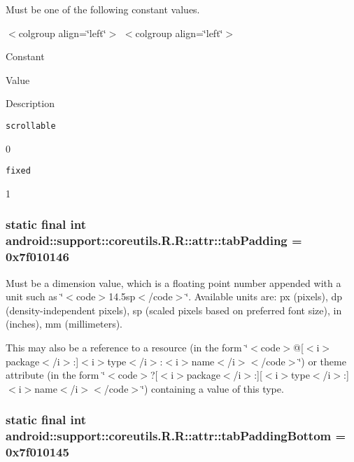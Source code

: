 Must be one of the following constant values. \begin{TabularC}{0}
\hline
\end{TabularC}
$<$colgroup align=\char`\"{}left\char`\"{}$>$ $<$colgroup align=\char`\"{}left\char`\"{}$>$ 

Constant

Value

Description 

{\tt scrollable}

0

{\tt fixed}

1\hypertarget{classandroid_1_1support_1_1coreutils_1_1_r_1_1attr_bcc94a081acd64311c3ed87241974506}{
\subsubsection[{tabPadding}]{\setlength{\rightskip}{0pt plus 5cm}static final int android::support::coreutils.R.R::attr::tabPadding = 0x7f010146}}
\label{classandroid_1_1support_1_1coreutils_1_1_r_1_1attr_bcc94a081acd64311c3ed87241974506}


Must be a dimension value, which is a floating point number appended with a unit such as \char`\"{}$<$code$>$14.5sp$<$/code$>$\char`\"{}. Available units are: px (pixels), dp (density-independent pixels), sp (scaled pixels based on preferred font size), in (inches), mm (millimeters). 

This may also be a reference to a resource (in the form \char`\"{}$<$code$>$@\mbox{[}$<$i$>$package$<$/i$>$:\mbox{]}$<$i$>$type$<$/i$>$:$<$i$>$name$<$/i$>$$<$/code$>$\char`\"{}) or theme attribute (in the form \char`\"{}$<$code$>$?\mbox{[}$<$i$>$package$<$/i$>$:\mbox{]}\mbox{[}$<$i$>$type$<$/i$>$:\mbox{]}$<$i$>$name$<$/i$>$$<$/code$>$\char`\"{}) containing a value of this type. \hypertarget{classandroid_1_1support_1_1coreutils_1_1_r_1_1attr_d416169e5cb21f86214b4ba8bb1869a7}{
\subsubsection[{tabPaddingBottom}]{\setlength{\rightskip}{0pt plus 5cm}static final int android::support::coreutils.R.R::attr::tabPaddingBottom = 0x7f010145}}
\label{classandroid_1_1support_1_1coreutils_1_1_r_1_1attr_d416169e5cb21f86214b4ba8bb1869a7}


